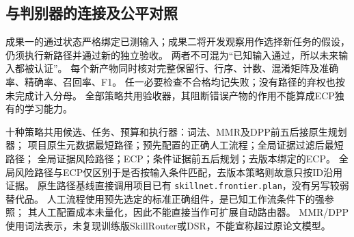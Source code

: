 \subsection{与判别器的连接及公平对照}
成果一的通过状态严格绑定已测输入；成果二将开发观察用作选择新任务的假设，
仍须执行新路径并通过新的独立验收。
两者不可混为“已知输入通过，所以未来输入都被认证”。
每个新产物同时核对完整保留行、行序、计数、混淆矩阵及准确率、精确率、召回率、F1。
任一必要检查不合格均记失败；没有路径的弃权也按未完成计入分母。
全部策略共用验收器，其阻断错误产物的作用不能算成ECP独有的学习能力。

十种策略共用候选、任务、预算和执行器：词法、MMR及DPP前五后接原生规划器；
项目原生元数据最短路径；预先配置的正确人工流程；全局证据过滤后最短路径；
全局证据风险路径；ECP；条件证据前五后规划；去版本绑定的ECP。
全局风险路径与ECP仅区别于是否按输入条件匹配，去版本策略则故意只按ID沿用证据。
原生路径基线直接调用项目已有 \texttt{skillnet.frontier.plan}，没有另写较弱替代品。
人工流程使用预先选定的标准正确组件，是已知工作流条件下的强参照；
其人工配置成本未量化，因此不能直接当作可扩展自动路由器。
MMR/DPP使用词法表示，未复现训练版SkillRouter或DSR，不能宣称超过原论文模型。
